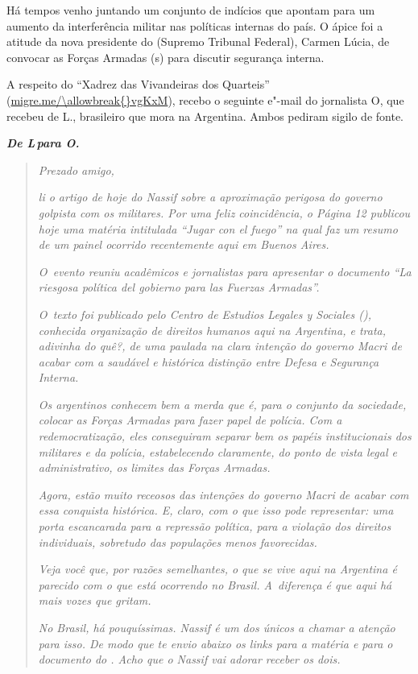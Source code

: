  

Há tempos venho juntando um conjunto de indícios que apontam para um
aumento da interferência militar nas políticas internas do país. O ápice
foi a atitude da nova presidente do  (Supremo Tribunal Federal),
Carmen Lúcia, de convocar as Forças Armadas (s) para discutir
segurança interna.

A respeito do ``Xadrez das Vivandeiras dos Quarteis''
(\url{migre.me/\allowbreak{}vgKxM}), recebo o seguinte e"-mail do jornalista O,
que recebeu de L., brasileiro que mora na Argentina. Ambos pediram
sigilo de fonte.

\textbf{\emph{De L\,para O.}}

\begin{quote}
\emph{Prezado amigo,}

\emph{li o artigo de hoje do Nassif sobre a aproximação perigosa do
governo golpista com os militares. Por uma feliz coincidência, o Página
12 publicou hoje uma matéria intitulada ``Jugar con el fuego'' na qual
faz um resumo de um painel ocorrido recentemente aqui em Buenos Aires.}

\emph{O~evento reuniu acadêmicos e jornalistas para apresentar o
documento ``La riesgosa política del gobierno para las Fuerzas
Armadas''.}

\emph{O~texto foi publicado pelo Centro de Estudios Legales y Sociales
(), conhecida organização de direitos humanos aqui na Argentina, e
trata, adivinha do quê?, de uma paulada na clara intenção do governo
Macri de acabar com a saudável e histórica distinção entre Defesa e
Segurança Interna.}

\emph{Os argentinos conhecem bem a merda que é, para o conjunto da
sociedade, colocar as Forças Armadas para fazer papel de polícia. Com a
redemocratização, eles conseguiram separar bem os papéis institucionais
dos militares e da polícia, estabelecendo claramente, do ponto de vista
legal e administrativo, os limites das Forças Armadas.}

\emph{Agora, estão muito receosos das intenções do governo Macri de
acabar com essa conquista histórica. E, claro, com o que isso pode
representar: uma porta escancarada para a repressão política, para a
violação dos direitos individuais, sobretudo das populações menos
favorecidas.}

\emph{Veja você que, por razões semelhantes, o que se vive aqui na
Argentina é parecido com o que está ocorrendo no Brasil. A~diferença é
que aqui há mais vozes que gritam.}

\emph{No Brasil, há pouquíssimas. Nassif é um dos únicos a chamar a
atenção para isso. De modo que te envio abaixo os links para a matéria e
para o documento do . Acho que o Nassif vai adorar receber os dois.}
\end{quote}

